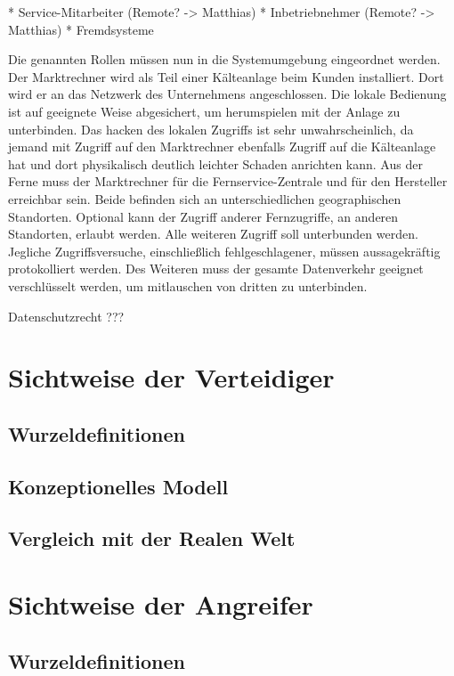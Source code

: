 \documentclass[11pt,a4paper]{report}
\begin{document}
* Service-Mitarbeiter (Remote? -> Matthias)
* Inbetriebnehmer (Remote? -> Matthias)
* Fremdsysteme

Die genannten Rollen müssen nun in die Systemumgebung eingeordnet werden. Der Marktrechner wird als Teil einer Kälteanlage beim Kunden installiert. Dort wird er an das Netzwerk des Unternehmens angeschlossen. Die lokale Bedienung ist auf geeignete Weise abgesichert, um herumspielen mit der Anlage zu unterbinden. Das hacken des lokalen Zugriffs ist sehr unwahrscheinlich, da jemand mit Zugriff auf den Marktrechner ebenfalls Zugriff auf die Kälteanlage hat und dort physikalisch deutlich leichter Schaden anrichten kann. Aus der Ferne muss der Marktrechner für die Fernservice-Zentrale und für den Hersteller erreichbar sein. Beide befinden sich an unterschiedlichen geographischen Standorten. Optional kann der Zugriff anderer Fernzugriffe, an anderen Standorten, erlaubt werden. Alle weiteren Zugriff soll unterbunden werden. Jegliche Zugriffsversuche, einschließlich fehlgeschlagener, müssen aussagekräftig protokolliert werden. Des Weiteren muss der gesamte Datenverkehr geeignet verschlüsselt werden, um mitlauschen von dritten zu unterbinden.

Datenschutzrecht ???

\section{Sichtweise der Verteidiger} 

\subsection{Wurzeldefinitionen}

\subsection{Konzeptionelles Modell}

\subsection{Vergleich mit der Realen Welt}

\section{Sichtweise der Angreifer}

\subsection{Wurzeldefinitionen}
\end{document}
